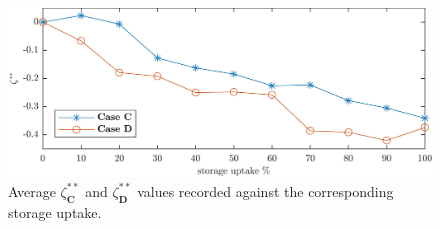 \begin{figure}\centering
	 \includegraphics{_chapter4/fig/utilisation-aimd-compare}
	 \caption{Average $\zeta_\textbf{C}^{**}$ and $\zeta_\textbf{D}^{**}$ values recorded against the corresponding storage uptake.}
	 \label{ch4:fig:utilisation-aimd-compare}
\end{figure}
